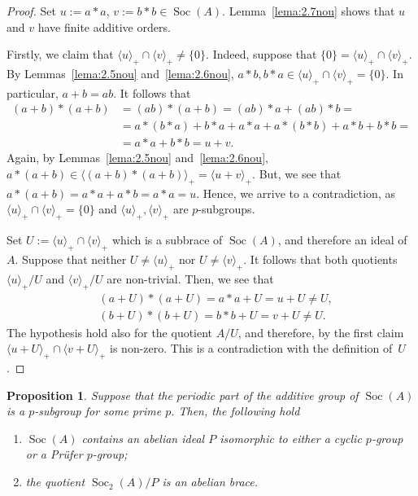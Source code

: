 \documentclass[12pt, a4paper, english]{article}
\newtheorem{proposicio}[teorema]{Proposition}
\theoremstyle{definition}
\DeclareMathOperator{\Soc}{Soc}
\begin{document}
\begin{proof}
Set $u := a \ast a$, $v:= b \ast b \in \Soc(A)$. Lemma~\ref{lema:2.7nou} shows that $u$ and $v$ have finite additive orders.

Firstly, we claim that $\langle u \rangle_+ \cap \langle v \rangle_+ \neq \{0\}$. Indeed, suppose that $\{0\} = \langle u \rangle_+ \cap \langle v \rangle_+$. By Lemmas~\ref{lema:2.5nou} and~\ref{lema:2.6nou}, $a\ast b, b\ast a \in \langle u \rangle_+ \cap \langle v \rangle_+ = \{0\}$. In particular, $a+b = ab$. It follows that
\begin{align*}
(a+b) \ast (a+b) & = (ab) \ast (a+b) = (ab)\ast a + (ab) \ast b = \\
& = a \ast (b\ast a) + b\ast a + a \ast a + a \ast (b\ast b) + a \ast b + b \ast b = \\
& = a \ast a + b \ast b = u + v.
\end{align*}
Again, by Lemmas~\ref{lema:2.5nou} and~\ref{lema:2.6nou}, $a \ast (a+b) \in \langle (a+b) \ast(a+b)\rangle_+ = \langle u + v \rangle_+$. But, we see that $a\ast (a+b) = a \ast a + a \ast b = a \ast a = u$. Hence, we arrive to a contradiction, as  $\langle u \rangle_+ \cap \langle v \rangle_+ = \{0\}$ and $\langle u \rangle_+, \langle v \rangle_+$ are $p$-subgroups.

Set $U := \langle u \rangle_+ \cap \langle v \rangle_+$ which is a subbrace of $\Soc(A)$, and therefore an ideal of $A$. Suppose that neither $U \neq \langle u \rangle_+$ nor $U \neq \langle v \rangle_+$. It follows that both quotients $ \langle u \rangle_+/U$ and $\langle v \rangle_+/U$ are non-trivial. Then, we see that
\begin{align*}
& (a+U)\ast (a+U) = a \ast a + U = u + U \neq U, \\
& (b+U) \ast (b+U) = b\ast b + U = v + U \neq U.
\end{align*}
The hypothesis hold also for the quotient $A/U$, and therefore, by the first claim $\langle u +U \rangle_+ \cap \langle v + U \rangle_+$ is non-zero. This is a contradiction with the definition of~$U$.
\end{proof}


\begin{proposicio}
\label{prop:2.12nou}
Suppose that the periodic part of the additive group of $\Soc(A)$ is a $p$-subgroup for some prime $p$. Then, the following hold
\begin{enumerate}
\item $\Soc(A)$ contains an abelian ideal $P$ isomorphic to either a cyclic $p$-group or a Prüfer $p$-group;
\item the quotient $\Soc_2(A)/P$ is an abelian brace.
\end{enumerate}
\end{proposicio}
\end{document}
